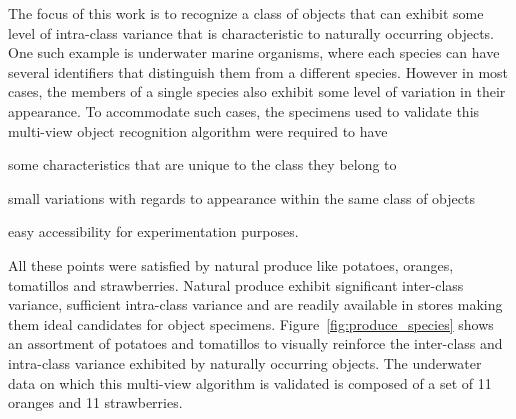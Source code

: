 \documentclass {udthesis}
\begin{document}
The focus of this work is to recognize a class of objects that can exhibit some level of intra-class variance that is characteristic to naturally occurring objects. One such example is underwater marine organisms, where each species can have several identifiers that distinguish them from a different species. However in most cases, the members of a single species also exhibit some level of variation in their appearance. To accommodate such cases, the specimens used to validate this multi-view object recognition algorithm were required to have \begin{enumerate*}[label=(\roman*)]  \item some characteristics that are unique to the class they belong to \item small variations with regards to appearance within the same class of objects \item easy accessibility for experimentation purposes. \end{enumerate*} All these points were satisfied by natural produce like potatoes, oranges, tomatillos and strawberries. Natural produce exhibit significant inter-class variance, sufficient intra-class variance and are readily available in stores making them ideal 
candidates for object specimens. Figure~\ref{fig:produce_species} shows an assortment of potatoes and tomatillos to visually reinforce the inter-class and intra-class variance exhibited by naturally occurring objects. The underwater data on which this multi-view algorithm is validated is composed of a set of 11 oranges and 11 strawberries.
%
\end{document}
